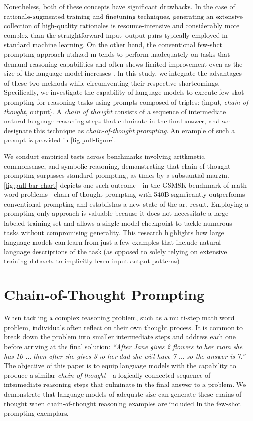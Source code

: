 Nonetheless, both of these concepts have significant drawbacks. In the case of rationale-augmented training and finetuning techniques, generating an extensive collection of high-quality rationales is resource-intensive and considerably more complex than the straightforward input--output pairs typically employed in standard machine learning. On the other hand, the conventional few-shot prompting approach utilized in \citet{brown2020language} tends to perform inadequately on tasks that demand reasoning capabilities and often shows limited improvement even as the size of the language model increases \citep{rae2021scaling}. In this study, we integrate the advantages of these two methods while circumventing their respective shortcomings. Specifically, we investigate the capability of language models to execute few-shot prompting for reasoning tasks using prompts composed of triples: $\langle$input, \emph{chain of thought}, output$\rangle$.  
A \emph{chain of thought} consists of a sequence of intermediate natural language reasoning steps that culminate in the final answer, and we designate this technique as \textit{chain-of-thought prompting}. An example of such a prompt is provided in \cref{fig:pull-figure}.  

We conduct empirical tests across benchmarks involving arithmetic, commonsense, and symbolic reasoning, demonstrating that chain-of-thought prompting surpasses standard prompting, at times by a substantial margin. \cref{fig:pull-bar-chart} depicts one such outcome—in the GSM8K benchmark of math word problems \citep{cobbe2021training}, chain-of-thought prompting with \palm{} 540B significantly outperforms conventional prompting and establishes a new state-of-the-art result. Employing a prompting-only approach is valuable because it does not necessitate a large labeled training set and allows a single model checkpoint to tackle numerous tasks without compromising generality. This research highlights how large language models can learn from just a few examples that include natural language descriptions of the task (as opposed to solely relying on extensive training datasets to implicitly learn input-output patterns).

\section{Chain-of-Thought Prompting} When tackling a complex reasoning problem, such as a multi-step math word problem, individuals often reflect on their own thought process. It is common to break down the problem into smaller intermediate steps and address each one before arriving at the final solution: \textit{``After Jane gives 2 flowers to her mom she has 10 $\ldots$ then after she gives 3 to her dad she will have 7 $\ldots$ so the answer is 7.''} The objective of this paper is to equip language models with the capability to produce a similar \textit{chain of thought}—a logically connected sequence of intermediate reasoning steps that culminate in the final answer to a problem. We demonstrate that language models of adequate size can generate these chains of thought when chain-of-thought reasoning examples are included in the few-shot prompting exemplars.

